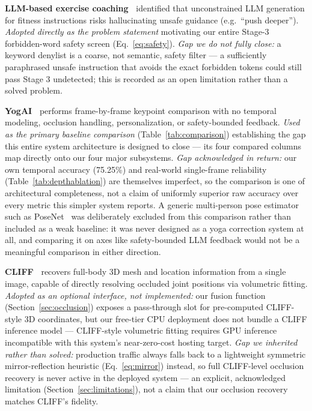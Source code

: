 \documentclass[conference]{IEEEtran}
\begin{document}
\textbf{LLM-based exercise coaching~\cite{llm_fitness_2024}} identified that
unconstrained LLM generation for fitness instructions risks hallucinating
unsafe guidance (e.g.\ ``push deeper''). \emph{Adopted directly as the problem
statement} motivating our entire Stage-3 forbidden-word safety screen
(Eq.~\ref{eq:safety}). \emph{Gap we do not fully close:} a keyword denylist is
a coarse, not semantic, safety filter --- a sufficiently paraphrased unsafe
instruction that avoids the exact forbidden tokens could still pass Stage 3
undetected; this is recorded as an open limitation rather than a solved
problem.

\textbf{YogAI~\cite{yogai2021}} performs frame-by-frame keypoint comparison
with no temporal modeling, occlusion handling, personalization, or
safety-bounded feedback. \emph{Used as the primary baseline comparison}
(Table~\ref{tab:comparison}) establishing the gap this entire system
architecture is designed to close --- its four compared columns map directly
onto our four major subsystems. \emph{Gap acknowledged in return:} our own
temporal accuracy (75.25\%) and real-world single-frame reliability
(Table~\ref{tab:depthablation}) are themselves imperfect, so the comparison is
one of architectural completeness, not a claim of uniformly superior raw
accuracy over every metric this simpler system reports. A generic multi-person
pose estimator such as PoseNet~\cite{posenet2019} was deliberately excluded
from this comparison rather than included as a weak baseline: it was never
designed as a yoga correction system at all, and comparing it on axes like
safety-bounded LLM feedback would not be a meaningful comparison in either
direction.

\textbf{CLIFF~\cite{cliff2022}} recovers full-body 3D mesh and location
information from a single image, capable of directly resolving occluded joint
positions via volumetric fitting. \emph{Adopted as an optional interface, not
implemented:} our fusion function (Section~\ref{sec:occlusion}) exposes a
pass-through slot for pre-computed CLIFF-style 3D coordinates, but our
free-tier CPU deployment does not bundle a CLIFF inference model --- CLIFF-style
volumetric fitting requires GPU inference incompatible with this system's
near-zero-cost hosting target. \emph{Gap we inherited rather than solved:}
production traffic always falls back to a lightweight symmetric
mirror-reflection heuristic (Eq.~\ref{eq:mirror}) instead, so full CLIFF-level
occlusion recovery is never active in the deployed system --- an explicit,
acknowledged limitation (Section~\ref{sec:limitations}), not a claim that our
occlusion recovery matches CLIFF's fidelity.
\end{document}
